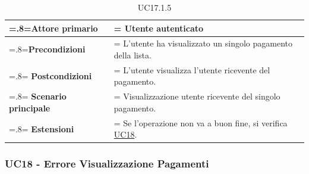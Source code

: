             \begin{table}[H]
                \centering
                \renewcommand{\arraystretch}{1.8}
                \renewcommand\tabularxcolumn[1]{m{#1}}
                \begin{tabularx}{0.9\textwidth} {
                    >{\hsize=.8\hsize\linewidth=\hsize}X
                    >{\hsize=1.2\hsize\linewidth=\hsize}X}
                    \hline
                    \textbf{Attore primario} & Utente autenticato \\
                    \hline
                    \textbf{Precondizioni} & L'utente ha visualizzato un singolo pagamento della lista. \\
                    \hline
                    \textbf{Postcondizioni} & L'utente visualizza l'utente ricevente del pagamento. \\
                    \hline
                    \textbf{Scenario principale} & Visualizzazione utente ricevente del singolo pagamento. \\
                    \hline
                    \textbf{Estensioni} & Se l'operazione non va a buon fine, si verifica \hyperref[UC18]{UC18}. \\
                    \hline
                \end{tabularx}
                \caption{UC17.1.5}
            \end{table}

        \subsubsection{UC18 - Errore Visualizzazione Pagamenti}
        \label{UC18}

